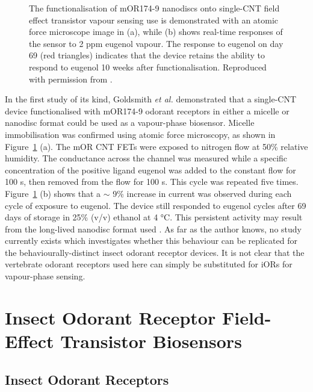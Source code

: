 \documentclass[
  a4paper,
]{scrbook}
\begin{document}
\begin{figure}
\begin{minipage}[t]{0.01\linewidth}
\end{minipage}%

\caption[Functionalisation and sensing behaviour of the nanodisc-based
carbon nanotube field-effect transistor of Goldsmith \emph{et
al.}]{\label{fig-eugenol-responses}The functionalisation of mOR174-9
nanodiscs onto single-CNT field effect transistor vapour sensing use is
demonstrated with an atomic force microscope image in (a), while (b)
shows real-time responses of the sensor to 2 ppm eugenol vapour. The
response to eugenol on day 69 (red triangles) indicates that the device
retains the ability to respond to eugenol 10 weeks after
functionalisation. Reproduced with permission from
\autocite{Goldsmith2011}.}

\end{figure}

In the first study of its kind, Goldsmith \emph{et al.} demonstrated
that a single-CNT device functionalised with mOR174-9 odorant receptors
in either a micelle or nanodisc format could be used as a vapour-phase
biosensor. Micelle immobilisation was confirmed using atomic force
microscopy, as shown in Figure~\ref{fig-eugenol-responses} (a). The mOR
CNT FETs were exposed to nitrogen flow at 50\% relative humidity. The
conductance across the channel was measured while a specific
concentration of the positive ligand eugenol was added to the constant
flow for 100 s, then removed from the flow for 100 s. This cycle was
repeated five times. Figure~\ref{fig-eugenol-responses} (b) shows that a
\(\sim\) 9\% increase in current was observed during each cycle of
exposure to eugenol. The device still responded to eugenol cycles after
69 days of storage in 25\% (v/v) ethanol at 4 °C. This persistent
activity may result from the long-lived nanodisc format used
\autocite{Goldsmith2011}. As far as the author knows, no study currently
exists which investigates whether this behaviour can be replicated for
the behaviourally-distinct insect odorant receptor devices. It is not
clear that the vertebrate odorant receptors used here can simply be
substituted for iORs for vapour-phase sensing.

\hypertarget{sec-insect-OR-biosensors}{%
\section{Insect Odorant Receptor Field-Effect Transistor
Biosensors}\label{sec-insect-OR-biosensors}}

\hypertarget{insect-odorant-receptors}{%
\subsection{Insect Odorant Receptors}\label{insect-odorant-receptors}}
\end{document}
